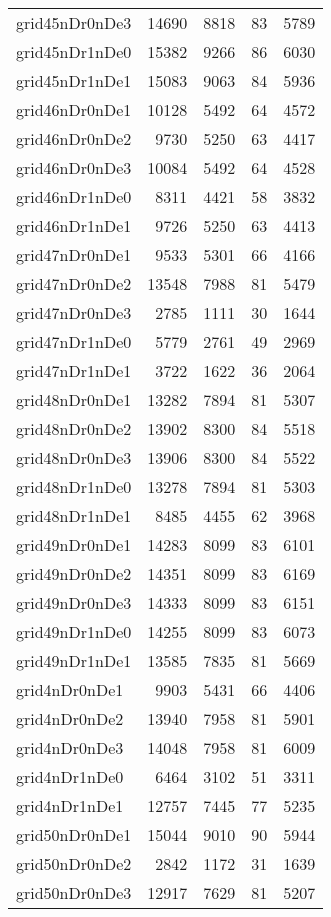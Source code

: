 \documentclass[../../../thesis.tex]{subfiles}
\begin{document}
\begin{longtable}{lrrrr}
grid45nDr0nDe3 & 14690 & 8818 & 83 & 5789 \\
grid45nDr1nDe0 & 15382 & 9266 & 86 & 6030 \\
grid45nDr1nDe1 & 15083 & 9063 & 84 & 5936 \\
grid46nDr0nDe1 & 10128 & 5492 & 64 & 4572 \\
grid46nDr0nDe2 & 9730 & 5250 & 63 & 4417 \\
grid46nDr0nDe3 & 10084 & 5492 & 64 & 4528 \\
grid46nDr1nDe0 & 8311 & 4421 & 58 & 3832 \\
grid46nDr1nDe1 & 9726 & 5250 & 63 & 4413 \\
grid47nDr0nDe1 & 9533 & 5301 & 66 & 4166 \\
grid47nDr0nDe2 & 13548 & 7988 & 81 & 5479 \\
grid47nDr0nDe3 & 2785 & 1111 & 30 & 1644 \\
grid47nDr1nDe0 & 5779 & 2761 & 49 & 2969 \\
grid47nDr1nDe1 & 3722 & 1622 & 36 & 2064 \\
grid48nDr0nDe1 & 13282 & 7894 & 81 & 5307 \\
grid48nDr0nDe2 & 13902 & 8300 & 84 & 5518 \\
grid48nDr0nDe3 & 13906 & 8300 & 84 & 5522 \\
grid48nDr1nDe0 & 13278 & 7894 & 81 & 5303 \\
grid48nDr1nDe1 & 8485 & 4455 & 62 & 3968 \\
grid49nDr0nDe1 & 14283 & 8099 & 83 & 6101 \\
grid49nDr0nDe2 & 14351 & 8099 & 83 & 6169 \\
grid49nDr0nDe3 & 14333 & 8099 & 83 & 6151 \\
grid49nDr1nDe0 & 14255 & 8099 & 83 & 6073 \\
grid49nDr1nDe1 & 13585 & 7835 & 81 & 5669 \\
grid4nDr0nDe1 & 9903 & 5431 & 66 & 4406 \\
grid4nDr0nDe2 & 13940 & 7958 & 81 & 5901 \\
grid4nDr0nDe3 & 14048 & 7958 & 81 & 6009 \\
grid4nDr1nDe0 & 6464 & 3102 & 51 & 3311 \\
grid4nDr1nDe1 & 12757 & 7445 & 77 & 5235 \\
grid50nDr0nDe1 & 15044 & 9010 & 90 & 5944 \\
grid50nDr0nDe2 & 2842 & 1172 & 31 & 1639 \\
grid50nDr0nDe3 & 12917 & 7629 & 81 & 5207 \\

\end{longtable}
\end{document}
